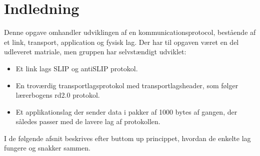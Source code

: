 \chapter{Indledning}\label{ch:introduction}
Denne opgave omhandler udviklingen af en kommunicationsprotocol, bestående af et link, transport, application og fysisk lag. Der har til opgaven været en del udleveret matriale, men gruppen har selvstændigt udviklet:

\begin{itemize}
	\item Et link lags SLIP og antiSLIP protokol.
	\item En troværdig transportlagsprotokol med transportlagsheader, som følger lærerbogens rd2.0 protokol.
	\item Et applikationslag der sender data i pakker af 1000 bytes af gangen, der således passer med de lavere lag af protokollen.
\end{itemize}  

I de følgende afsnit beskrives efter buttom up princippet, hvordan de enkelte lag fungere og snakker sammen.

